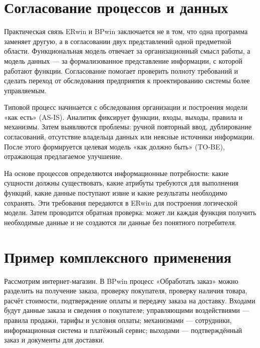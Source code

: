 \documentclass[essaypaper,paper]{pmk-graduate}
\begin{document}
\section{Согласование процессов и данных}

Практическая связь ERwin и BPwin заключается не в том, что одна программа заменяет другую, а в согласовании двух представлений одной предметной области. Функциональная модель отвечает за организационный смысл работы, а модель данных — за формализованное представление информации, с которой работают функции. Согласование помогает проверить полноту требований и сделать переход от обследования предприятия к проектированию системы более управляемым.

\par

Типовой процесс начинается с обследования организации и построения модели «как есть» (AS-IS). Аналитик фиксирует функции, входы, выходы, правила и механизмы. Затем выявляются проблемы: ручной повторный ввод, дублирование согласований, отсутствие владельца данных или неясные источники информации. После этого формируется целевая модель «как должно быть» (TO-BE), отражающая предлагаемое улучшение.

\par

На основе процессов определяются информационные потребности: какие сущности должны существовать, какие атрибуты требуются для выполнения функций, какие данные поступают извне и какие результаты необходимо сохранять. Эти требования передаются в ERwin для построения логической модели. Затем проводится обратная проверка: может ли каждая функция получить необходимые данные и не создаются ли данные без понятного потребителя.

\par

\section{Пример комплексного применения}

Рассмотрим интернет-магазин. В BPwin процесс «Обработать заказ» можно разделить на получение заказа, проверку покупателя, проверку наличия товара, расчёт стоимости, подтверждение оплаты и передачу заказа на доставку. Входами будут данные заказа и сведения о покупателе; управляющими воздействиями — правила продажи, тарифы и условия оплаты; механизмами — сотрудники, информационная система и платёжный сервис; выходами — подтверждённый заказ и документы для доставки.
\end{document}
